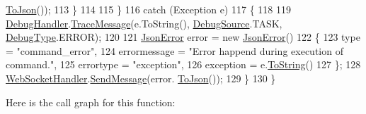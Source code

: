 \begin{DoxyCode}
      \mbox{\hyperlink{class_little_weeb_library_1_1_models_1_1_json_error_a0e3e7dd2e2990404b7f0461742b23440}{ToJson}}());
113                 \}
114                
115             \}
116             \textcolor{keywordflow}{catch} (Exception e)
117             \{
118 
119                 \mbox{\hyperlink{class_little_weeb_library_1_1_handlers_1_1_debug_handler}{DebugHandler}}.\mbox{\hyperlink{class_little_weeb_library_1_1_handlers_1_1_debug_handler_afccb37dfd6b2114af72000c2f4fe4607}{TraceMessage}}(e.ToString(), 
      \mbox{\hyperlink{namespace_little_weeb_library_1_1_handlers_a2a6ca0775121c9c503d58aa254d292be}{DebugSource}}.TASK, \mbox{\hyperlink{namespace_little_weeb_library_1_1_handlers_ab66019ed40462876ec4e61bb3ccb0a62}{DebugType}}.ERROR);
120 
121                 \mbox{\hyperlink{class_little_weeb_library_1_1_models_1_1_json_error}{JsonError}} error = \textcolor{keyword}{new} \mbox{\hyperlink{class_little_weeb_library_1_1_models_1_1_json_error}{JsonError}}()
122                 \{
123                     type = \textcolor{stringliteral}{"command\_error"},
124                     errormessage = \textcolor{stringliteral}{"Error happend during execution of command."},
125                     errortype = \textcolor{stringliteral}{"exception"},
126                     exception = e.\mbox{\hyperlink{class_little_weeb_library_1_1_models_1_1_json_error_ad7d5522c90119111d2e929f39e7f6d3c}{ToString}}()
127                 \};
128                 \mbox{\hyperlink{class_little_weeb_library_1_1_handlers_1_1_web_socket_handler}{WebSocketHandler}}.\mbox{\hyperlink{class_little_weeb_library_1_1_handlers_1_1_web_socket_handler_a1de289d54d665a32c93478c68d3e6ad0}{SendMessage}}(error.
      \mbox{\hyperlink{class_little_weeb_library_1_1_models_1_1_json_error_a0e3e7dd2e2990404b7f0461742b23440}{ToJson}}());
129             \}
130         \}
\end{DoxyCode}
Here is the call graph for this function\+:\nopagebreak
